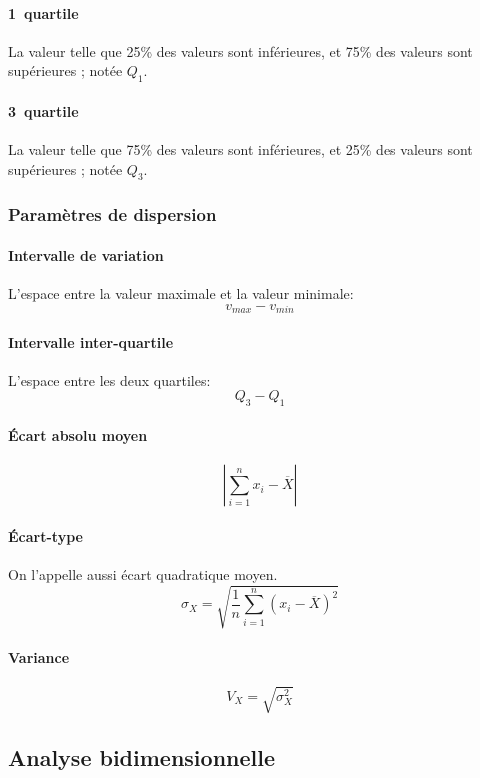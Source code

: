 \documentclass[10pt,a4paper,french]{article}
\begin{document}
\paragraph{1\ier~quartile}
La valeur telle que 25\% des valeurs sont inférieures, et 75\% des valeurs sont supérieures ; notée $Q_1$.

\paragraph{3\ieme~quartile}
La valeur telle que 75\% des valeurs sont inférieures, et 25\% des valeurs sont supérieures ; notée $Q_3$.

\subsubsection{Paramètres de dispersion}

\paragraph{Intervalle de variation}
L'espace entre la valeur maximale et la valeur minimale: \[ v_{max} - v_{min} \]

\paragraph{Intervalle inter-quartile}
L'espace entre les deux quartiles: \[ Q_3 - Q_1 \]

\paragraph{Écart absolu moyen}
\[ \left\vert \sum_{i=1}^n x_i - \overline{X} \right\vert \]

\paragraph{Écart-type} On l'appelle aussi écart quadratique moyen.
\[ \sigma_X = \sqrt{\frac{1}{n} \sum_{i=1}^n (x_i - \overline{X})^2} \]

\paragraph{Variance}
\[ V_X = \sqrt{\sigma_X^2} \]

\subsection{Analyse bidimensionnelle}
\end{document}
